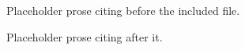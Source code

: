 \documentclass{article}
\begin{document}
Placeholder prose citing \citep{vale2016} before the included file.


Placeholder prose citing \citet{doe2024} after it.



\end{document}
